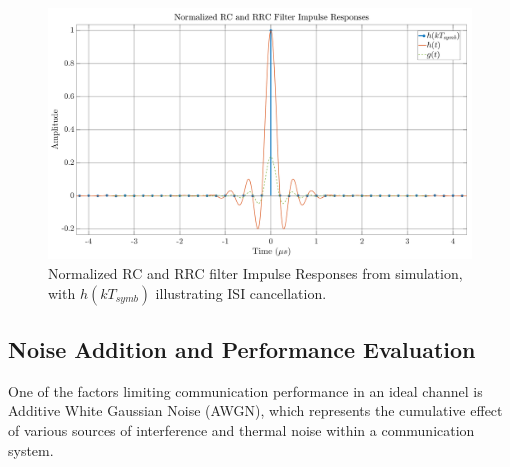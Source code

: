 \begin{figure}[H]
	\centering
	\includegraphics[width=0.9\linewidth]{Images/h-rc} 
	\caption{Normalized RC and RRC filter Impulse Responses from simulation, with $h(kT_{symb})$ illustrating ISI cancellation.}
	\label{fig:h-rc}
\end{figure}

\subsection{Noise Addition and Performance Evaluation}
One of the factors limiting communication performance in an ideal channel is Additive White Gaussian Noise (AWGN), which represents the cumulative effect of various sources of interference and thermal noise within a communication system.\par

